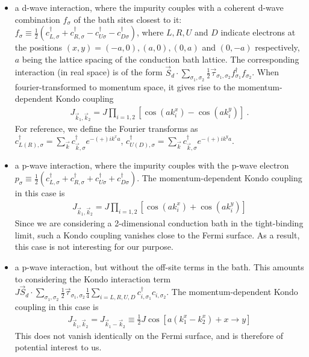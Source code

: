 \documentclass{revtex4-2}
\begin{document}
\begin{itemize}
		\item a d-wave interaction, where the impurity couples with a coherent d-wave combination \(f_\sigma\) of the bath sites closest to it: \(f_\sigma \equiv \frac{1}{2}\left(c^\dagger_{L,\sigma} + c^\dagger_{R,\sigma} - c^\dagger_{U\sigma} - c^\dagger_{D\sigma}\right)\), where \(L,R,U\) and \(D\) indicate electrons at the positions \((x,y)=\left(-a,0\right), \left( a,0 \right) , \left( 0,a \right) \) and \(\left( 0,-a \right) \) respectively, \(a\) being the lattice spacing of the conduction bath lattice. The corresponding interaction (in real space) is of the form \(\vec{S}_d\cdot\sum_{\sigma_1,\sigma_2}\frac{1}{2}\vec{\tau}_{\sigma_1,\sigma_2}f^\dagger_{\sigma_1}f_{\sigma_2}\). When fourier-transformed to momentum space, it gives rise to the momentum-dependent Kondo coupling 
\begin{equation}\begin{aligned}\label{J_dwave}
	J_{\vec k_1, \vec k_2} = J\prod_{i=1,2}\left[\cos\left( ak_i^x \right) - \cos\left( ak_i^y \right) \right]~.
\end{aligned}\end{equation}
For reference, we define the Fourier transforms as \(c^\dagger_{L(R),\sigma} = \sum_{\vec k}c^\dagger_{\vec k,\sigma}e^{-(+)ik^x a}\), \(c^\dagger_{U(D),\sigma} = \sum_{\vec k}c^\dagger_{\vec k,\sigma}e^{-(+)ik^y a}\).
		\item a p-wave interaction, where the impurity couples with the p-wave electron \(p_\sigma \equiv \frac{1}{2}\left(c^\dagger_{L,\sigma} + c^\dagger_{R,\sigma} + c^\dagger_{U\sigma} + c^\dagger_{D\sigma}\right)\). The momentum-dependent Kondo coupling in this case is 
\begin{equation}\begin{aligned}\label{J_pwave}
	J_{\vec k_1, \vec k_2} = J\prod_{i=1,2}\left[\cos\left( ak_i^x \right) + \cos\left( ak_i^y \right) \right]
\end{aligned}\end{equation}
Since we are considering a 2-dimensional conduction bath in the tight-binding limit, such a Kondo coupling vanishes close to the Fermi surface. As a result, this case is not interesting for our purpose.
		\item a p-wave interaction, but without the off-site terms in the bath. This amounts to considering the Kondo interaction term \(J\vec{S}_d\cdot\sum_{\sigma_1,\sigma_2}\frac{1}{2}\vec{\tau}_{\sigma_1,\sigma_2}\frac{1}{4}\sum_{i=L,R,U,D}c^\dagger_{i,\sigma_1}c_{i,\sigma_2}\). The momentum-dependent Kondo coupling in this case is 
\begin{equation}\begin{aligned}\label{J_pwave_nooffsite}
	J_{\vec k_1, \vec k_2} = J_{\vec k_1 - \vec k_2} \equiv \frac{1}{2}J \cos\left[ a\left( k_1^x - k_2^x \right) + x\to y \right]
\end{aligned}\end{equation}
This does not vanish identically on the Fermi surface, and is therefore of potential interest to us.
\end{itemize}
\end{document}

